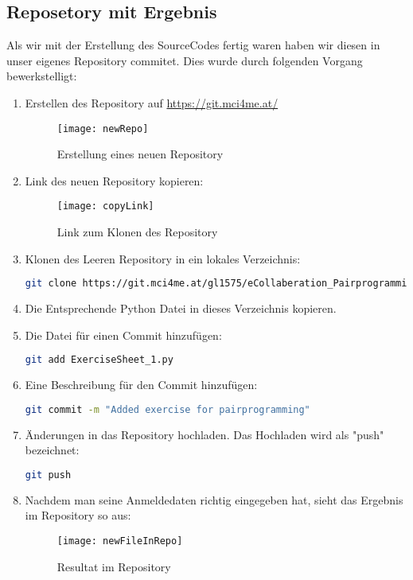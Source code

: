 \documentclass[12pt]{article}
\begin{document}
\subsection{Reposetory mit Ergebnis}
Als wir mit der Erstellung des SourceCodes fertig waren haben wir diesen in unser eigenes Repository commitet. Dies wurde durch folgenden Vorgang bewerkstelligt:
\begin{enumerate}
 \item Erstellen des Repository auf \url{https://git.mci4me.at/}
 \begin{figure}[h]
  \begin{center}
   \texttt{[image: newRepo]}
   \caption{Erstellung eines neuen Repository}
  \end{center}
 \end{figure}
 \item Link des neuen Repository kopieren:
 \begin{figure}[h]
  \begin{center}
   \texttt{[image: copyLink]}
   \caption{Link zum Klonen des Repository}
  \end{center}
 \end{figure}
 \item Klonen des Leeren Repository in ein lokales Verzeichnis:
 \begin{lstlisting}[caption={CLI Kommando zum Klonen eines Repository},language=Bash,frame=single]
  git clone https://git.mci4me.at/gl1575/eCollaberation_Pairprogramming.git
 \end{lstlisting}
  \item Die Entsprechende Python Datei in dieses Verzeichnis kopieren.
  \item Die Datei für einen Commit hinzufügen:
  \begin{lstlisting}[caption={CLI Kommando zum Hinzufügen einer Datei für einen Commit},language=Bash,frame=single]
  git add ExerciseSheet_1.py
 \end{lstlisting}
 \item Eine Beschreibung für den Commit hinzufügen:
 \begin{lstlisting}[caption={CLI Kommando zum Hinzufügen einer Beschreibung für einen Commit},language=Bash,frame=single]
  git commit -m "Added exercise for pairprogramming"
 \end{lstlisting}
 \item Änderungen in das Repository hochladen. Das Hochladen wird als "push" bezeichnet:
 \begin{lstlisting}[caption={Hochladen der Änderungen},language=Bash,frame=single]
  git push
 \end{lstlisting}
 \item Nachdem man seine Anmeldedaten richtig eingegeben hat, sieht das Ergebnis im Repository so aus:
 \begin{figure}[h]
  \begin{center}
   \texttt{[image: newFileInRepo]}
   \caption{Resultat im Repository}
  \end{center}
 \end{figure}
 \end{enumerate}
\pagebreak

\listoffigures
\lstlistoflistings
\end{document}
